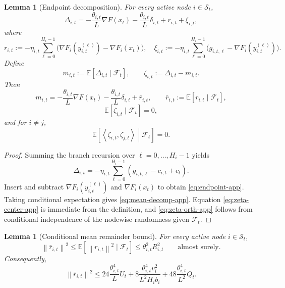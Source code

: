 \documentclass{article}
\newtheorem{lemma}[theorem]{Lemma}
\theoremstyle{definition}
\newcommand{\EE}{\mathbb E}
\newcommand{\cF}{\mathcal F}
\newcommand{\norm}[1]{\left\lVert #1\right\rVert}
\newcommand{\ip}[2]{\left\langle #1,#2\right\rangle}
\begin{document}
\begin{lemma}[Endpoint decomposition]
\label{lem:endpoint}
For every active node $i\in\mathcal S_t$,
\begin{equation}
\Delta_{i,t}
=
-\frac{\theta_{i,t}}{L}\nabla F(x_t)
-\frac{\theta_{i,t}}{L}\delta_{i,t}
+r_{i,t}
+\xi_{i,t},
\label{eq:endpoint-app}\end{equation}
where
\[
r_{i,t}
:=
-\eta_{i,t}\sum_{\ell=0}^{H_i-1}\bigl(\nabla F_i(y_{i,t}^{(\ell)})-\nabla F_i(x_t)\bigr),\quad\xi_{i,t}
:=
-\eta_{i,t}\sum_{\ell=0}^{H_i-1}\bigl(g_{i,t,\ell}-\nabla F_i(y_{i,t}^{(\ell)})\bigr).
\]
Define
\[
m_{i,t}:=\EE[\Delta_{i,t}\mid \cF_t],
\qquad
\zeta_{i,t}:=\Delta_{i,t}-m_{i,t}.
\]
Then
\begin{equation}
m_{i,t}
=
-\frac{\theta_{i,t}}{L}\nabla F(x_t)
-\frac{\theta_{i,t}}{L}\delta_{i,t}
+\bar r_{i,t},
\qquad
\bar r_{i,t}:=\EE[r_{i,t}\mid \cF_t],
\label{eq:mean-decomp-app}\end{equation}
\begin{equation}
\EE[\zeta_{i,t}\mid \cF_t]=0,
\label{eq:zeta-center-app}\end{equation}
and for $i\neq j$,
\begin{equation}
\EE\!\left[\ip{\zeta_{i,t}}{\zeta_{j,t}}\middle|\cF_t\right]=0.
\label{eq:zeta-orth-app}\end{equation}
\end{lemma}

\begin{proof}
Summing the branch recursion over $\ell=0,\dots,H_i-1$ yields
\[
\Delta_{i,t}
=
-\eta_{i,t}\sum_{\ell=0}^{H_i-1}(g_{i,t,\ell}-c_{i,t}+c_t).
\]
Insert and subtract $\nabla F_i(y_{i,t}^{(\ell)})$ and $\nabla F_i(x_t)$ to obtain
\eqref{eq:endpoint-app}. Taking conditional expectation gives
\eqref{eq:mean-decomp-app}. Equation \eqref{eq:zeta-center-app} is immediate
from the definition, and \eqref{eq:zeta-orth-app} follows from conditional
independence of the nodewise randomness given $\cF_t$.
\end{proof}

\begin{lemma}[Conditional mean remainder bound]
\label{lem:rbar}
For every active node $i\in\mathcal S_t$,
\begin{equation}
\norm{\bar r_{i,t}}^2
\le
\EE[\norm{r_{i,t}}^2\mid \cF_t]
\le
\theta_{i,t}^2 R_{i,t}^2
\qquad\text{almost surely.}
\label{eq:rbar-app}\end{equation}
Consequently,
\[
\norm{\bar r_{i,t}}^2
\le
24\frac{\theta_{i,t}^4}{L}U_t
+
8\frac{\theta_{i,t}^4v_i^2}{L^2 H_i b_i}
+
48\frac{\theta_{i,t}^4}{L^2}Q_t.
\]
\end{lemma}
\end{document}
